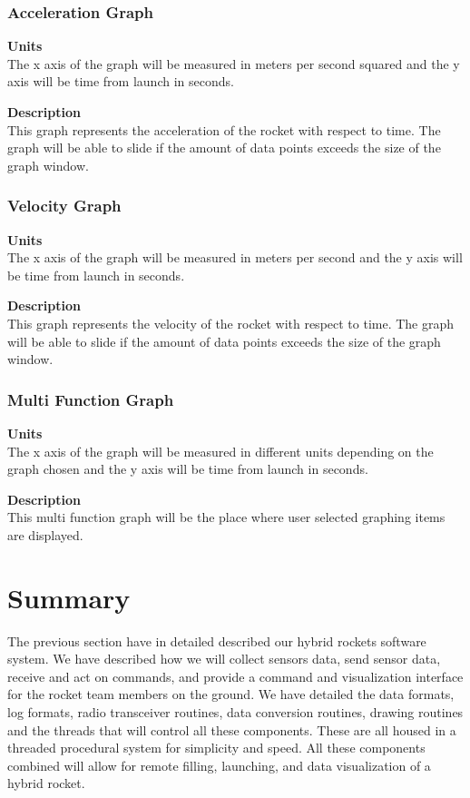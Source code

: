 \documentclass[10pt,draftclsnofoot,onecolumn,retainorgcmds]{IEEEtran}
\begin{document}
\subsubsection{Acceleration Graph}
{\bf Units} \\ The x axis of the graph will be measured in meters per second squared and the y axis will be time from launch in seconds.\par
{\bf Description} \\ This graph represents the acceleration of the rocket with respect to time. The graph will be able to slide if the amount of data points exceeds the size of the graph window. \par

\subsubsection{Velocity Graph}
{\bf Units} \\ The x axis of the graph will be measured in meters per second and the y axis will be time from launch in seconds.\par
{\bf Description} \\ This graph represents the velocity of the rocket with respect to time. The graph will be able to slide if the amount of data points exceeds the size of the graph window. \par

\subsubsection{Multi Function Graph}
{\bf Units} \\ The x axis of the graph will be measured in different units depending on the graph chosen and the y axis will be time from launch in seconds.\par
{\bf Description} \\ This multi function graph will be the place where user selected graphing items are displayed. \par

\section{Summary}
The previous section have in detailed described our hybrid rockets software system. We have described how we will collect sensors data, send sensor data, receive and act on commands, and provide  a command and visualization interface for the rocket team members on the ground. We have detailed the data formats, log formats, radio transceiver routines, data conversion routines, drawing routines and the threads that will control all these components. These are all housed in a threaded procedural system for simplicity and speed. All these components combined will allow for remote filling, launching, and data visualization of a hybrid rocket. \par
\end{document}
